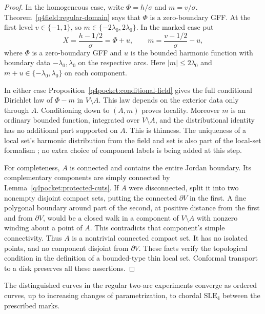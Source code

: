 \begin{proof}
In the homogeneous case, write $\Phi=h/\sigma$ and $m=v/\sigma$.
Theorem~\ref{q4field:regular-domain} says that $\Phi$ is a
zero-boundary GFF.  At the first level $v\in\{-1,1\}$, so
$m\in\{-2\lambda_0,2\lambda_0\}$.  In the marked case put
\[
 X=\frac{h-1/2}{\sigma}=\Phi+u,
 \qquad
 m=\frac{v-1/2}{\sigma}-u,
\]
where $\Phi$ is a zero-boundary GFF and $u$ is the bounded
harmonic function with boundary data $-\lambda_0,\lambda_0$
on the respective arcs.  Here $|m|\leq2\lambda_0$ and
$m+u\in\{-\lambda_0,\lambda_0\}$ on each component.

In either case Proposition~\ref{q4pocket:conditional-field}
gives the full conditional Dirichlet law of $\Phi-m$ in
$V\setminus A$.  This law depends on the exterior data only
through $A$.  Conditioning down to $(A,m)$ proves locality.
Moreover $m$ is an ordinary bounded function, integrated over
$V\setminus A$, and the distributional identity has no
additional part supported on $A$.  This is thinness.  The
uniqueness of a local set's harmonic distribution from the
field and set is also part of the local-set formalism
\citep[Lemma~2.3(1)]{AruLupuSepulveda2020}; no extra choice
of component labels is being added at this step.

For completeness, $A$ is connected and contains the entire
Jordan boundary.  Its complementary components are simply
connected by Lemma~\ref{q4pocket:protected-cuts}.  If $A$
were disconnected, split it into two nonempty disjoint compact
sets, putting the connected $\partial V$ in the first.  A fine
polygonal boundary around part of the second, at positive
distance from the first and from $\partial V$, would be a
closed walk in a component of $V\setminus A$ with nonzero
winding about a point of $A$.  This contradicts that
component's simple connectivity.  Thus $A$ is a nontrivial
connected compact set.  It has no isolated points, and no
component disjoint from $\partial V$.  These facts verify
the topological condition in the definition of a bounded-type
thin local set.  Conformal transport to a disk preserves all
these assertions.
\end{proof}

\begin{proposition}
\label{q4pocket:regular-chordal}
The distinguished curves in the regular two-arc experiments
converge as ordered curves, up to increasing changes of parametrization,
to chordal $\mathrm{SLE}_4$ between the prescribed marks.
\end{proposition}

